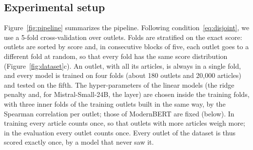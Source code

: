 \documentclass[11pt,a4paper]{article}
\begin{document}
\subsection{Experimental setup}\label{sec:setup}
Figure~\ref{fig:pipeline} summarizes the pipeline. Following condition~\eqref{eq:disjoint}, we use a 5-fold
cross-validation over outlets. Folds are stratified on the exact score: outlets are sorted by score and, in consecutive
blocks of five, each outlet goes to a different fold at random, so that every fold has the same score distribution
(Figure~\ref{fig:dataset}c). An outlet, with all its articles, is always in a single fold, and every model is trained
on four folds (about 180 outlets and 20,000 articles) and tested on the fifth. The hyper-parameters of the linear models (the ridge penalty and, for Mistral-Small-24B, the layer) are chosen inside
the training folds, with three inner folds of the training outlets built in the same way, by the Spearman correlation
per outlet; those of ModernBERT are fixed (below). In training every article counts once, so that outlets with more
articles weigh more; in the evaluation every outlet counts once. Every outlet of the dataset is thus scored exactly once, by a model that never saw it.
\end{document}
